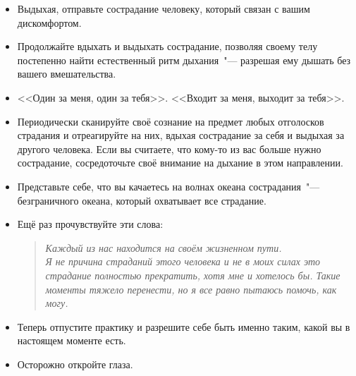 \begin{itemize}
	\item Выдыхая, отправьте сострадание человеку, который связан с вашим дискомфортом.
	
	\item Продолжайте вдыхать и выдыхать сострадание, позволяя своему телу постепенно найти естественный ритм дыхания~"--- разрешая ему дышать без вашего вмешательства.
	
	\item <<Один за меня, один за тебя>>. <<Входит за меня, выходит за тебя>>.
	
	\item Периодически сканируйте своё сознание на предмет любых отголосков страдания и отреагируйте на них, вдыхая сострадание за себя и выдыхая за другого человека. Если вы считаете, что кому-то из вас больше нужно сострадание, сосредоточьте своё внимание на дыхание в этом направлении.
	
	\item Представьте себе, что вы качаетесь на волнах океана сострадания~"--- безграничного океана, который охватывает все страдание.
	
	\item Ещё раз прочувствуйте эти слова:
	\begin{quotation}
		\begin{center}
			\noindent\textit{
				Каждый из нас находится на своём жизненном пути.\\Я не причина страданий этого человека и не в моих силах это страдание полностью прекратить, хотя мне и хотелось бы. Такие моменты тяжело перенести, но я все равно пытаюсь помочь, как могу.
			}
		\end{center}
	\end{quotation}

	\item Теперь отпустите практику и разрешите себе быть именно таким, какой вы в настоящем моменте есть.
	
	\item Осторожно откройте глаза.
\end{itemize}


